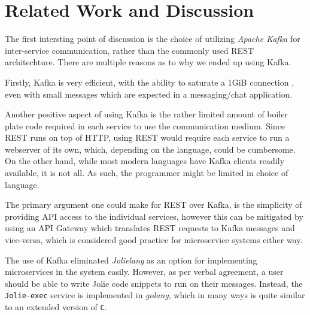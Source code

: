 
\section{Related Work and Discussion}\label{sec:relatedWorkAndDiscussion}


The first intersting point of discussion is the choice of utilizing \textit{Apache Kafka} for inter-service communication, rather than the commonly used REST architechture. 
There are multiple reasons as to why we ended up using Kafka. 

Firstly, Kafka is very efficient, with the ability to saturate a 1GiB connection \cite{kafkaEfficiency}, even with small messages which are expected in a messaging/chat application.

Another positive aspect of using Kafka is the rather limited amount of boiler plate code required in each service to use the communication medium. Since REST runs on top of HTTP, using REST would require each service to run a webserver of its own, which, depending on the language, could be cumbersome.
On the other hand, while most modern languages have Kafka clients readily available, it is not all. As such, the programmer might be limited in choice of language.

The primary argument one could make for REST over Kafka, is the simplicity of providing API access to the individual services, however this can be mitigated by using an API Gateway which translates REST requests to Kafka messages and vice-versa, which is considered good practice for microservice systems either way.

\bigskip

The use of Kafka eliminated \textit{Jolielang} as an option for implementing microservices in the system easily. However, as per verbal agreement, a user should be able to write Jolie code snippets to run on their messages.
Instead, the \texttt{Jolie-exec} service is implemented in \textit{golang}, which in many ways is quite similar to an extended version of \texttt{C}. 


